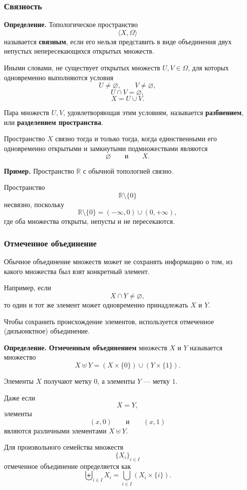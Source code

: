 \documentclass[12pt,a4paper,oneside,openany]{book}
\theoremstyle{definition}
\theoremstyle{plain}
\theoremstyle{remark}
\begin{document}
\subsubsection{Связность}

\textbf{Определение.}
Топологическое пространство
\[
\langle X,\Omega\rangle
\]
называется \textbf{связным}, если его нельзя представить в виде
объединения двух непустых непересекающихся открытых множеств.

Иными словами, не существует открытых множеств \(U,V\in\Omega\),
для которых одновременно выполняются условия
\[
U\neq\varnothing,
\qquad
V\neq\varnothing,
\]
\[
U\cap V=\varnothing,
\]
\[
X=U\cup V.
\]

Пара множеств \(U,V\), удовлетворяющая этим условиям, называется
\textbf{разбиением}, или \textbf{разделением пространства}.


Пространство \(X\) связно тогда и только тогда, когда единственными
его одновременно открытыми и замкнутыми подмножествами являются
\[
\varnothing
\qquad\text{и}\qquad
X.
\]

\textbf{Пример.}
Пространство \(\mathbb R\) с обычной топологией связно.

Пространство
\[
\mathbb R\setminus\{0\}
\]
несвязно, поскольку
\[
\mathbb R\setminus\{0\}
=
(-\infty,0)\cup(0,+\infty),
\]
где оба множества открыты, непусты и не пересекаются.

\subsubsection{Отмеченное объединение}

Обычное объединение множеств может не сохранять информацию о том,
из какого множества был взят конкретный элемент.

Например, если
\[
X\cap Y\neq\varnothing,
\]
то один и тот же элемент может одновременно принадлежать \(X\) и
\(Y\).

Чтобы сохранить происхождение элементов, используется отмеченное (дизъюнктное) объединение.

\textbf{Определение.}
\textbf{Отмеченным объединением} множеств \(X\) и \(Y\) называется
множество
\[
X\uplus Y
=
(X\times\{0\})
\cup
(Y\times\{1\}).
\]

Элементы \(X\) получают метку \(0\), а элементы \(Y\) --- метку \(1\).

Даже если
\[
X=Y,
\]
элементы
\[
(x,0)
\qquad\text{и}\qquad
(x,1)
\]
являются различными элементами \(X \uplus Y\).

Для произвольного семейства множеств
\[
\{X_i\}_{i\in I}
\]
отмеченное объединение определяется как
\[
\biguplus_{i\in I}X_i
=
\bigcup_{i\in I}(X_i\times\{i\}).
\]
\end{document}
